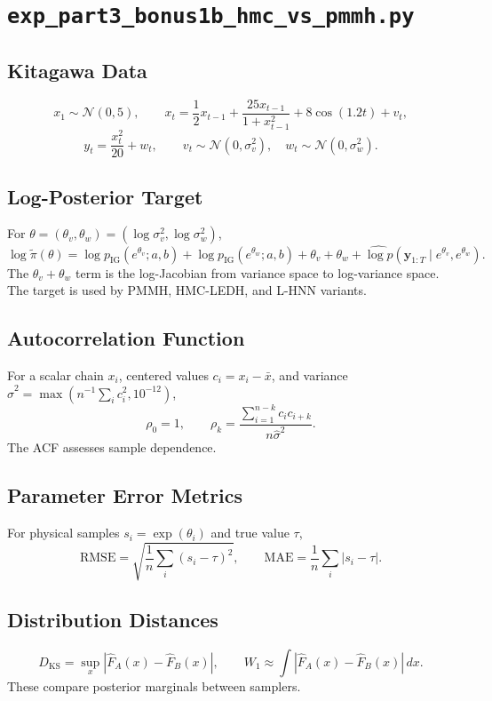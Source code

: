 \documentclass[11pt]{article}
\newcommand{\code}[1]{\texttt{#1}}
\newcommand{\RMSE}{\mathrm{RMSE}}
\newcommand{\MAE}{\mathrm{MAE}}
\begin{document}
\section{\code{exp\_part3\_bonus1b\_hmc\_vs\_pmmh.py}}
\subsection*{Kitagawa Data}
\[
x_1\sim\mathcal N(0,5),\qquad
x_t=\frac12x_{t-1}+\frac{25x_{t-1}}{1+x_{t-1}^2}+8\cos(1.2t)+v_t,
\]
\[
y_t=\frac{x_t^2}{20}+w_t,\qquad
v_t\sim\mathcal N(0,\sigma_v^2),\quad
w_t\sim\mathcal N(0,\sigma_w^2).
\]

\subsection*{Log-Posterior Target}
For \(\theta=(\theta_v,\theta_w)=(\log\sigma_v^2,\log\sigma_w^2)\),
\[
\log\tilde\pi(\theta)
=\log p_{\mathrm{IG}}(e^{\theta_v};a,b)
+\log p_{\mathrm{IG}}(e^{\theta_w};a,b)
+\theta_v+\theta_w
+\widehat{\log p}(\bm y_{1:T}\mid e^{\theta_v},e^{\theta_w}).
\]
The \(\theta_v+\theta_w\) term is the log-Jacobian from variance space to log-variance space. The target is used by PMMH, HMC-LEDH, and L-HNN variants.

\subsection*{Autocorrelation Function}
For a scalar chain \(x_i\), centered values \(c_i=x_i-\bar x\), and variance \(\hat\sigma^2=\max(n^{-1}\sum_ic_i^2,10^{-12})\),
\[
\rho_0=1,\qquad
\rho_k=\frac{\sum_{i=1}^{n-k}c_ic_{i+k}}{n\hat\sigma^2}.
\]
The ACF assesses sample dependence.

\subsection*{Parameter Error Metrics}
For physical samples \(s_i=\exp(\theta_i)\) and true value \(\tau\),
\[
\RMSE=\sqrt{\frac{1}{n}\sum_i(s_i-\tau)^2},\qquad
\MAE=\frac{1}{n}\sum_i|s_i-\tau|.
\]

\subsection*{Distribution Distances}
\[
D_{\mathrm{KS}}=\sup_x|\hat F_A(x)-\hat F_B(x)|,
\qquad
W_1\approx\int|\hat F_A(x)-\hat F_B(x)|\,dx.
\]
These compare posterior marginals between samplers.
\end{document}
